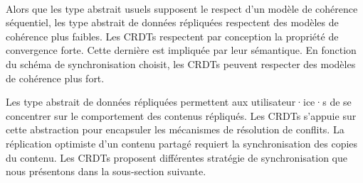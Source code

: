 
\paragraph{} Alors que les type abstrait usuels supposent le respect d'un modèle de cohérence séquentiel, les type abstrait de données répliquées respectent des modèles de cohérence plus faibles.
Les \acp{CRDT} respectent par conception la propriété de convergence forte.
Cette dernière est impliquée par leur sémantique.
En fonction du schéma de synchronisation choisit, les \acp{CRDT} peuvent respecter des modèles de cohérence plus fort.



Les type abstrait de données répliquées permettent aux utilisateur·ice·s de se concentrer sur le comportement des contenus répliqués.
Les \acp{CRDT} s'appuie sur cette abstraction pour encapsuler les mécanismes de résolution de conflits.
La réplication optimiste d'un contenu partagé requiert la synchronisation des copies du contenu.
Les \acp{CRDT} proposent différentes stratégie de synchronisation que nous présentons dans la sous-section suivante.


